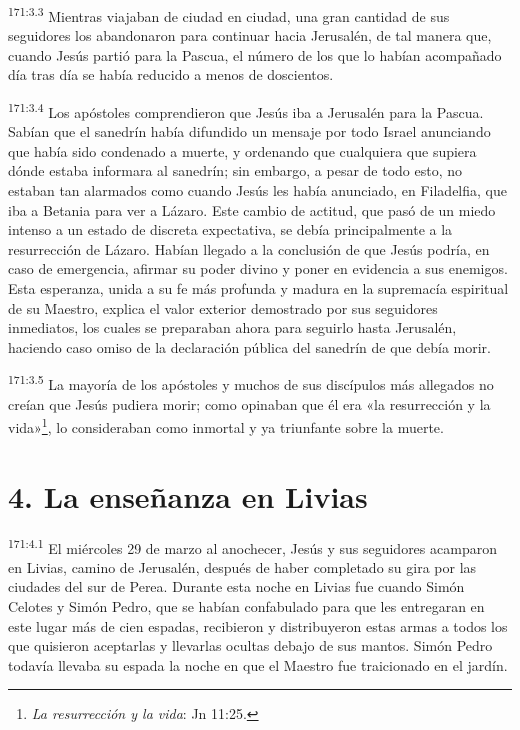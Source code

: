 \par 
\textsuperscript{171:3.3} Mientras viajaban de ciudad en ciudad, una gran cantidad de sus seguidores los abandonaron para continuar hacia Jerusalén, de tal manera que, cuando Jesús partió para la Pascua, el número de los que lo habían acompañado día tras día se había reducido a menos de doscientos.

\par 
\textsuperscript{171:3.4} Los apóstoles comprendieron que Jesús iba a Jerusalén para la Pascua. Sabían que el sanedrín había difundido un mensaje por todo Israel anunciando que había sido condenado a muerte, y ordenando que cualquiera que supiera dónde estaba informara al sanedrín; sin embargo, a pesar de todo esto, no estaban tan alarmados como cuando Jesús les había anunciado, en Filadelfia, que iba a Betania para ver a Lázaro. Este cambio de actitud, que pasó de un miedo intenso a un estado de discreta expectativa, se debía principalmente a la resurrección de Lázaro. Habían llegado a la conclusión de que Jesús podría, en caso de emergencia, afirmar su poder divino y poner en evidencia a sus enemigos. Esta esperanza, unida a su fe más profunda y madura en la supremacía espiritual de su Maestro, explica el valor exterior demostrado por sus seguidores inmediatos, los cuales se preparaban ahora para seguirlo hasta Jerusalén, haciendo caso omiso de la declaración pública del sanedrín de que debía morir.

\par 
\textsuperscript{171:3.5} La mayoría de los apóstoles y muchos de sus discípulos más allegados no creían que Jesús pudiera morir; como opinaban que él era «la resurrección y la vida»\footnote{\textit{La resurrección y la vida}: Jn 11:25.}, lo consideraban como inmortal y ya triunfante sobre la muerte.

\section*{4. La enseñanza en Livias}
\par 
\textsuperscript{171:4.1} El miércoles 29 de marzo al anochecer, Jesús y sus seguidores acamparon en Livias, camino de Jerusalén, después de haber completado su gira por las ciudades del sur de Perea. Durante esta noche en Livias fue cuando Simón Celotes y Simón Pedro, que se habían confabulado para que les entregaran en este lugar más de cien espadas, recibieron y distribuyeron estas armas a todos los que quisieron aceptarlas y llevarlas ocultas debajo de sus mantos. Simón Pedro todavía llevaba su espada la noche en que el Maestro fue traicionado en el jardín.

